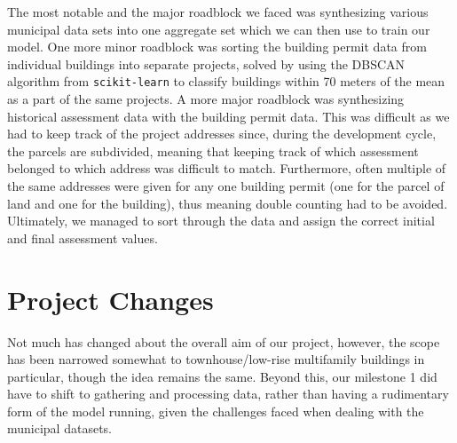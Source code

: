 \documentclass{article}
\begin{document}
\quad The most notable and the major roadblock we faced was synthesizing various municipal data sets into one aggregate set which we can then use to train our model. One more minor roadblock was sorting the building permit data from individual buildings into separate projects, solved by using the DBSCAN algorithm from \texttt{scikit-learn} to classify buildings within 70 meters of the mean as a part of the same projects. A more major roadblock was synthesizing historical assessment data with the building permit data. This was difficult as we had to keep track of the project addresses since, during the development cycle, the parcels are subdivided, meaning that keeping track of which assessment belonged to which address was difficult to match. Furthermore, often multiple of the same addresses were given for any one building permit (one for the parcel of land and one for the building), thus meaning double counting had to be avoided. Ultimately, we managed to sort through the data and assign the correct initial and final assessment values. 


\section*{Project Changes}

\quad Not much has changed about the overall aim of our project, however, the scope has been narrowed somewhat to townhouse/low-rise multifamily buildings in particular, though the idea remains the same. Beyond this, our milestone 1 did have to shift to gathering and processing data, rather than having a rudimentary form of the model running, given the challenges faced when dealing with the municipal datasets.
\end{document}
